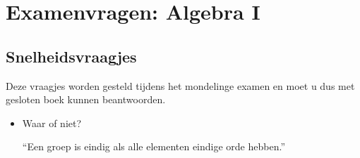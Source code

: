 \documentclass[main.tex]{subfiles}
\begin{document}
 \chapter{Examenvragen: Algebra I}
 \label{cha:examen-a}

 \section{Snelheidsvraagjes}
 \label{sec:snelheidsvraagjes}

Deze vraagjes worden gesteld tijdens het mondelinge examen en moet u dus met gesloten boek kunnen beantwoorden.

 \begin{itemize}
 \item Waar of niet?
   \begin{center}
     ``Een groep is eindig als alle elementen eindige orde hebben.''
   \end{center}


\end{itemize}
\end{document}
